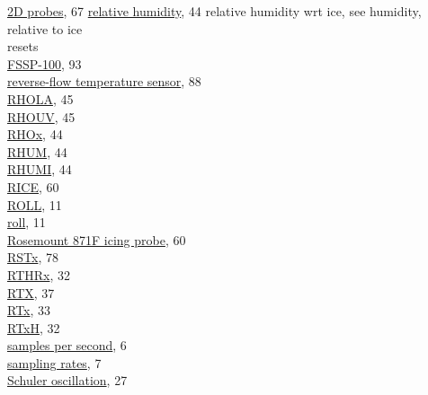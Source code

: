 \documentclass[
  english,
]{book}
\begin{document}
\hspace*{0.333em}\hspace*{0.333em}\href{./5-cloud-physics-variables.html\#dbz2d}{2D
probes}, 67 \href{./4-the-state-of-the-atmosphere.html\#rhumw}{relative
humidity}, 44 relative humidity wrt ice, see humidity, relative to ice\\
resets\\
\hspace*{0.333em}\hspace*{0.333em}\href{./10-obsolete-variables.html\#freset}{FSSP-100},
93\\
\href{./10-obsolete-variables.html\#ttrf}{reverse-flow temperature
sensor}, 88\\
\href{./4-the-state-of-the-atmosphere.html\#rho}{RHOLA}, 45\\
\href{./4-the-state-of-the-atmosphere.html\#rho}{RHOUV}, 45\\
\href{./4-the-state-of-the-atmosphere.html\#rho}{RHOx}, 44\\
\href{./4-the-state-of-the-atmosphere.html\#rhumw}{RHUM}, 44\\
\href{./4-the-state-of-the-atmosphere.html\#rhumi}{RHUMI}, 44\\
\href{./5-cloud-physics-variables.html\#rice}{RICE}, 60\\
\href{./3-the-state-of-the-aircraft.html\#roll}{ROLL}, 11\\
\href{./3-the-state-of-the-aircraft.html\#roll}{roll}, 11\\
\href{./5-cloud-physics-variables.html\#rice}{Rosemount 871F icing
probe}, 60\\
\href{./8-radiation-variables.html\#rstx}{RSTx}, 78\\
\href{./4-the-state-of-the-atmosphere.html\#recovery-t}{RTHRx}, 32\\
\href{./4-the-state-of-the-atmosphere.html\#recovery-t}{RTX}, 37\\
\href{./4-the-state-of-the-atmosphere.html\#recovery-t\%7C}{RTx}, 33\\
\href{./4-the-state-of-the-atmosphere.html\#recovery-t}{RTxH}, 32\\
\href{./2-general-information-about-data-files.html\#units-and-abbreviations}{samples
per second}, 6\\
\href{./2-general-information-about-data-files.html\#synchronization-of-measurements}{sampling
rates}, 7\\
\href{./3-the-state-of-the-aircraft.html\#inertial-reference-systems}{Schuler
oscillation}, 27\\
\end{document}
